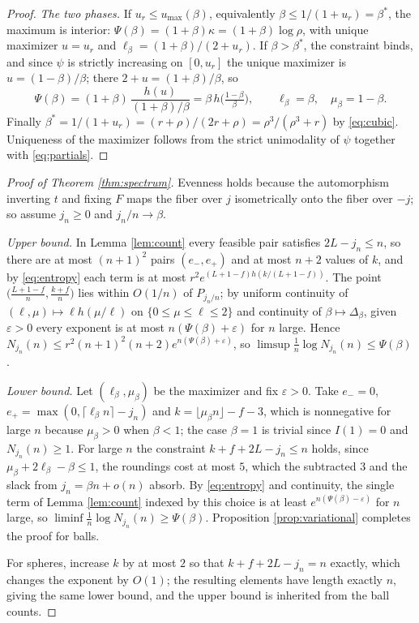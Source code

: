\documentclass[11pt]{amsart}
\theoremstyle{definition}
\theoremstyle{remark}
\begin{document}
\begin{proof}
\emph{The two phases.} If $u_r\le u_{\max}(\beta)$, equivalently $\beta\le1/(1+u_r)=\beta^{*}$, the maximum is interior: $\Psi(\beta)=(1+\beta)\kappa=(1+\beta)\log\rho$, with unique maximizer $u=u_r$ and $\ell_\beta=(1+\beta)/(2+u_r)$. If $\beta>\beta^{*}$, the constraint binds, and since $\psi$ is strictly increasing on $[0,u_r]$ the unique maximizer is $u=(1-\beta)/\beta$; there $2+u=(1+\beta)/\beta$, so
\[
\Psi(\beta)=(1+\beta)\,\frac{h(u)}{(1+\beta)/\beta}=\beta\,h\Big(\tfrac{1-\beta}\beta\Big),
\qquad
\ell_\beta=\beta,\quad \mu_\beta=1-\beta .
\]
Finally $\beta^{*}=1/(1+u_r)=(r+\rho)/(2r+\rho)=\rho^{3}/(\rho^{3}+r)$ by \eqref{eq:cubic}. Uniqueness of the maximizer follows from the strict unimodality of $\psi$ together with \eqref{eq:partials}.
\end{proof}

\begin{proof}[Proof of Theorem \ref{thm:spectrum}]
Evenness holds because the automorphism inverting $t$ and fixing $F$ maps the fiber over $j$ isometrically onto the fiber over $-j$; so assume $j_n\ge0$ and $j_n/n\to\beta$.

\emph{Upper bound.} In Lemma \ref{lem:count} every feasible pair satisfies $2L-j_n\le n$, so there are at most $(n+1)^2$ pairs $(e_-,e_+)$ and at most $n+2$ values of $k$, and by \eqref{eq:entropy} each term is at most $r^{2}e^{(L+1-f)h(k/(L+1-f))}$. The point $\big(\tfrac{L+1-f}{n},\tfrac{k+f}{n}\big)$ lies within $O(1/n)$ of $P_{j_n/n}$; by uniform continuity of $(\ell,\mu)\mapsto\ell h(\mu/\ell)$ on $\{0\le\mu\le\ell\le2\}$ and continuity of $\beta\mapsto \Delta_\beta$, given $\varepsilon>0$ every exponent is at most $n(\Psi(\beta)+\varepsilon)$ for $n$ large. Hence $N_{j_n}(n)\le r^{2}(n+1)^{2}(n+2)e^{n(\Psi(\beta)+\varepsilon)}$, so $\limsup\frac1n\log N_{j_n}(n)\le\Psi(\beta)$.

\emph{Lower bound.} Let $(\ell_\beta,\mu_\beta)$ be the maximizer and fix $\varepsilon>0$. Take $e_-=0$, $e_+=\max(0,\lceil\ell_\beta n\rceil-j_n)$ and $k=\lfloor\mu_\beta n\rfloor-f-3$, which is nonnegative for large $n$ because $\mu_\beta>0$ when $\beta<1$; the case $\beta=1$ is trivial since $I(1)=0$ and $N_{j_n}(n)\ge1$. For large $n$ the constraint $k+f+2L-j_n\le n$ holds, since $\mu_\beta+2\ell_\beta-\beta\le1$, the roundings cost at most $5$, which the subtracted $3$ and the slack from $j_n=\beta n+o(n)$ absorb. By \eqref{eq:entropy} and continuity, the single term of Lemma \ref{lem:count} indexed by this choice is at least $e^{n(\Psi(\beta)-\varepsilon)}$ for $n$ large, so $\liminf\frac1n\log N_{j_n}(n)\ge\Psi(\beta)$. Proposition \ref{prop:variational} completes the proof for balls.

For spheres, increase $k$ by at most $2$ so that $k+f+2L-j_n=n$ exactly, which changes the exponent by $O(1)$; the resulting elements have length exactly $n$, giving the same lower bound, and the upper bound is inherited from the ball counts.
\end{proof}
\end{document}
